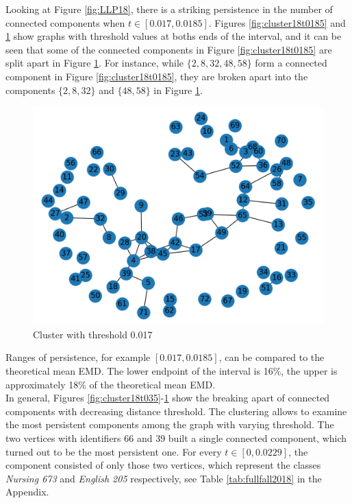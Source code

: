 \documentclass[12pt,letterpaper,oneside,openany]{book}
\begin{document}
Looking at Figure \ref{fig:LLP18}, there is a striking persistence in the number of connected components when $t \in [0.017, 0.0185]$. Figures \ref{fig:cluster18t0185} and \ref{fig:cluster18t017} show graphs with threshold values at boths ends of the interval, and it can be seen that some of the connected components in Figure \ref{fig:cluster18t0185} are split apart in Figure \ref{fig:cluster18t017}.
For instance, while $\{2, 8, 32, 48, 58\}$ form a connected component in Figure \ref{fig:cluster18t0185}, they are broken apart into the components $\{2, 8, 32\}$ and $\{48, 58\}$ in Figure \ref{fig:cluster18t017}.

\begin{figure}
	\centering
	\includegraphics[width=\textwidth]{./images/n2018_th_0p017_2.png}
	\caption{Cluster with threshold 0.017}
	\label{fig:cluster18t017}
\end{figure}

Ranges of persistence, for example $[0.017, 0.0185]$, can be compared to the theoretical mean EMD. The lower endpoint of the interval is 16\%, the upper is approximately 18\% of the theoretical mean EMD. \\
In general, Figures \ref{fig:cluster18t035}-\ref{fig:cluster18t017} show the breaking apart of connected components with decreasing distance threshold. The clustering allows to examine the most persistent components among the graph with varying threshold. The two vertices with identifiers 66 and 39 built a single connected component, which turned out to be the most persistent one.  For every $t \in [0, 0.0229]$, the component consisted of only those two vertices, which represent the classes \emph{Nursing 673} and \emph{English 205} respectively, see Table \ref{tab:fullfall2018} in the Appendix. 
\end{document}
